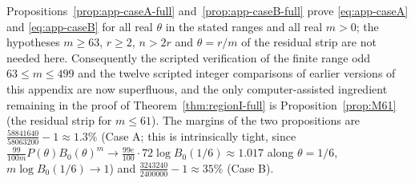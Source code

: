 \begin{remark}\label{rmk:app-no-computer}
Propositions~\ref{prop:app-caseA-full} and~\ref{prop:app-caseB-full} prove
\eqref{eq:app-caseA} and \eqref{eq:app-caseB} for all real $\theta$ in the
stated ranges and all real $m>0$; the hypotheses $m\ge63$, $r\ge2$, $n>2r$
and $\theta=r/m$ of the residual strip are not needed here.  Consequently
the scripted verification of the finite range odd $63\le m\le499$ and the
twelve scripted integer comparisons of earlier versions of this appendix are
now superfluous, and the only computer-assisted ingredient remaining in the
proof of Theorem~\ref{thm:regionI-full} is Proposition~\ref{prop:M61}
(the residual strip for $m\le61$).  The margins of the two propositions are
$\frac{58841640}{58063200}-1\approx1.3\%$ (Case A; this is intrinsically
tight, since $\frac{99}{100m}P(\theta)B_0(\theta)^m\to\frac{99e}{100}\cdot
72\log B_0(1/6)\approx1.017$ along $\theta=1/6$, $m\log B_0(1/6)\to1$) and
$\frac{3243240}{2400000}-1\approx35\%$ (Case B).
\end{remark}
